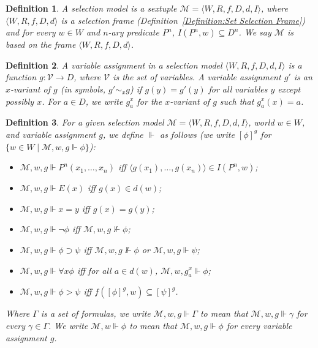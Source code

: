 \documentclass[12pt]{article}
\newtheorem{definition}{Definition}
\newcommand{\tup}[1]{\langle #1 \rangle}
\newcommand{\would}{\mathbin{>}}
\newcommand{\then}{\mathbin{\supset}}
\begin{document}
\begin{definition}
    \label{Definition:SelectionModel}
    A \emph{selection model} is a sextuple $\mathcal{M}=\tup{W,R,f,D,d,I}$, where $\tup{W,R,f,D,d}$ is a selection frame (Definition~\ref{Definition:Set Selection Frame}) and for every $w\in W$ and $n$-ary predicate $P^n$, $I(P^n,w)\subseteq D^n$. 
    We say $\mathcal{M}$ is \emph{based on} the frame $\tup{W,R,f,D,d}$. 
\end{definition}

\begin{definition}
    \label{Definition:VariableAssignment}
    A \emph{variable assignment} in a selection model $\tup{W,R,f,D,d,I}$ is a function $g:\mathcal{V}\to{D}$, where $\mathcal{V}$ is the set of variables. 
    A variable assignment $g'$ is an \emph{$x$-variant} of $g$ (in symbols, $g'\sim_{x}g$) if $g(y)=g'(y)$ for all variables $y$ except possibly $x$. 
    For $a\in D$, we write $g^x_a$ for the $x$-variant of $g$ such that $g^x_a(x) = a$. 
\end{definition}

\begin{definition}
\label{Definition:Satisfaction}
    For a given selection model $\mathcal{M} = \tup{W,R,f,D,d,I}$, world $w\in W$, and variable assignment $g$, we define $\Vdash$ as follows (we write $[\phi]^{g}$ for $\{w\in W \mid \mathcal{M},w,g \Vdash \phi\}$):    
    \begin{itemize}
        \item[At.] $\mathcal{M},w,g \Vdash P^{n}(x_1,\dots,x_n)$ iff $\tup{g(x_1),\dots,g(x_n)}\in I(P^{n},w)$;
        \item[$E$.] $\mathcal{M},w,g \Vdash E(x)$ iff $g(x) \in d(w)$; 
        \item[$=$.] $\mathcal{M},w,g \Vdash x = y$ iff $g(x) = g(y)$; 
        \item[$\neg$.] $\mathcal{M},w,g \Vdash \neg\phi$ iff $\mathcal{M},w,g\not\Vdash \phi$;
        \item[$\then$.] $\mathcal{M},w,g \Vdash \phi\then\psi$ iff $\mathcal{M},w,g\not\Vdash \phi$ or $\mathcal{M},w,g \Vdash \psi$;
        \item[$\forall$.] $\mathcal{M},w,g \Vdash \forall{x}\phi$ iff for all $a \in d(w)$, $\mathcal{M},w,g^x_a \Vdash \phi$;
        \item[$\would$.] $\mathcal{M},w,g \Vdash \phi \would \psi$ iff $f([\phi]^{g},w)\subseteq[\psi]^{g}$.
    \end{itemize}
    Where $\Gamma$ is a set of formulas, we write $\mathcal{M},w,g \Vdash \Gamma$ to mean that $\mathcal{M},w,g \Vdash \gamma$ for every $\gamma\in\Gamma$. 
    We write $\mathcal{M},w \Vdash \phi$ to mean that $\mathcal{M},w,g \Vdash \phi$ for every variable assignment $g$. 
\end{definition}
\end{document}

